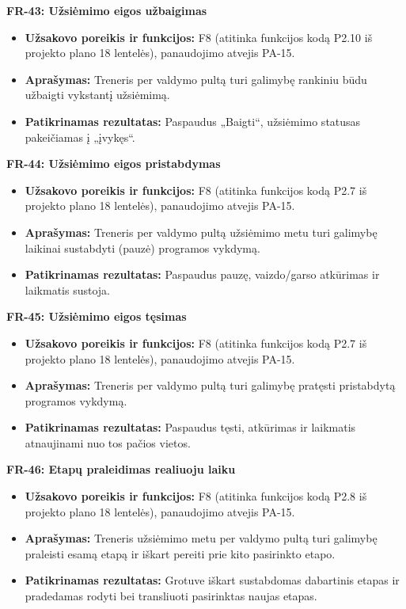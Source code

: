\vspace{0.3cm}
\noindent\textbf{FR-43: Užsiėmimo eigos užbaigimas}
\begin{itemize}
    \item \textbf{Užsakovo poreikis ir funkcijos:} F8 (atitinka funkcijos kodą P2.10 iš projekto plano 18 lentelės), panaudojimo atvejis PA-15.
    \item \textbf{Aprašymas:} Treneris per valdymo pultą turi galimybę rankiniu būdu užbaigti vykstantį užsiėmimą.
    \item \textbf{Patikrinamas rezultatas:} Paspaudus „Baigti“, užsiėmimo statusas pakeičiamas į „įvykęs“.
\end{itemize}

\vspace{0.3cm}
\noindent\textbf{FR-44: Užsiėmimo eigos pristabdymas}
\begin{itemize}
    \item \textbf{Užsakovo poreikis ir funkcijos:} F8 (atitinka funkcijos kodą P2.7 iš projekto plano 18 lentelės), panaudojimo atvejis PA-15.
    \item \textbf{Aprašymas:} Treneris per valdymo pultą užsiėmimo metu turi galimybę laikinai sustabdyti (pauzė) programos vykdymą.
    \item \textbf{Patikrinamas rezultatas:} Paspaudus pauzę, vaizdo/garso atkūrimas ir laikmatis sustoja.
\end{itemize}

\vspace{0.3cm}
\noindent\textbf{FR-45: Užsiėmimo eigos tęsimas}
\begin{itemize}
    \item \textbf{Užsakovo poreikis ir funkcijos:} F8 (atitinka funkcijos kodą P2.7 iš projekto plano 18 lentelės), panaudojimo atvejis PA-15.
    \item \textbf{Aprašymas:} Treneris per valdymo pultą turi galimybę pratęsti pristabdytą programos vykdymą.
    \item \textbf{Patikrinamas rezultatas:} Paspaudus tęsti, atkūrimas ir laikmatis atnaujinami nuo tos pačios vietos.
\end{itemize}

\vspace{0.3cm}
\noindent\textbf{FR-46: Etapų praleidimas realiuoju laiku}
\begin{itemize}
    \item \textbf{Užsakovo poreikis ir funkcijos:} F8 (atitinka funkcijos kodą P2.8 iš projekto plano 18 lentelės), panaudojimo atvejis PA-15.
    \item \textbf{Aprašymas:} Treneris užsiėmimo metu per valdymo pultą turi galimybę praleisti esamą etapą ir iškart pereiti prie kito pasirinkto etapo.
    \item \textbf{Patikrinamas rezultatas:} Grotuve iškart sustabdomas dabartinis etapas ir pradedamas rodyti bei transliuoti pasirinktas naujas etapas.
\end{itemize}

